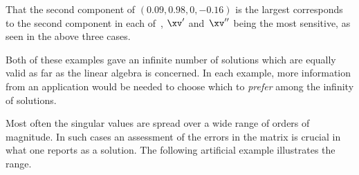 \begin{example}
\begin{enumerate}
\begin{solution}
That the second component of \((0.09,0.98,0,-0.16)\) is the largest corresponds to the second component in each of~\xv, \(\xv'\) and~\(\xv''\) being the most sensitive, as seen in the above three cases.
\end{solution}
\end{enumerate}

Both of these examples gave an infinite number of solutions which are equally valid as far as the linear algebra is concerned.
In each example, more information from an application would be needed to choose which to \emph{prefer} among the infinity of solutions.
\end{example}


Most often the singular values are spread over a wide range of orders of magnitude.
In such cases an assessment of the errors in the matrix is crucial in what one reports as a solution.
The following artificial example illustrates the range.

